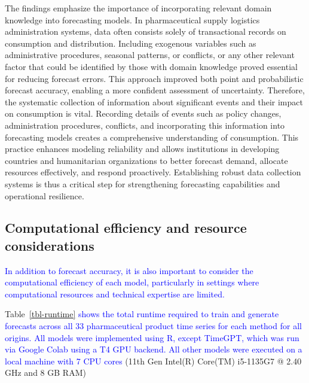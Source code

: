 \documentclass[
  authoryear,
  preprint,
  3p]{elsarticle}
\begin{document}
The findings emphasize the importance of incorporating relevant domain
knowledge into forecasting models. In pharmaceutical supply logistics
administration systems, data often consists solely of transactional
records on consumption and distribution. Including exogenous variables
such as administrative procedures, seasonal patterns, or conflicts, or
any other relevant factor that could be identified by those with domain
knowledge proved essential for reducing forecast errors. This approach
improved both point and probabilistic forecast accuracy, enabling a more
confident assessment of uncertainty. Therefore, the systematic
collection of information about significant events and their impact on
consumption is vital. Recording details of events such as policy
changes, administration procedures, conflicts, and incorporating this
information into forecasting models creates a comprehensive
understanding of consumption. This practice enhances modeling
reliability and allows institutions in developing countries and
humanitarian organizations to better forecast demand, allocate resources
effectively, and respond proactively. Establishing robust data
collection systems is thus a critical step for strengthening forecasting
capabilities and operational resilience.

\subsection{Computational efficiency and resource
considerations}\label{computational-efficiency-and-resource-considerations}

\textcolor{blue}{In addition to forecast accuracy, it is also important to consider the computational efficiency of each model, particularly in settings where computational resources and technical expertise are limited.}

Table~\ref{tbl-runtime}
\textcolor{blue}{shows the total runtime required to train and generate forecasts across all 33 pharmaceutical product time series for each method for all origins. All models were implemented using R, except TimeGPT, which was run via Google Colab using a T4 GPU backend. All other models were executed on a local machine with 7 CPU cores}
(11th Gen Intel(R) Core(TM) i5-1135G7 @ 2.40 GHz and 8 GB RAM)
\end{document}
